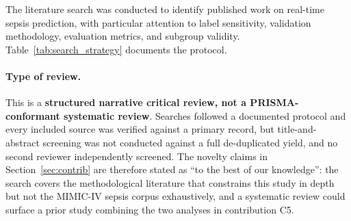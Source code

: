 The literature search was conducted to identify published work on real-time
sepsis prediction, with particular attention to label sensitivity, validation
methodology, evaluation metrics, and subgroup validity.
Table~\ref{tab:search_strategy} documents the protocol.

\paragraph{Type of review.} This is a \textbf{structured narrative critical
review, not a PRISMA-conformant systematic review}. Searches followed a
documented protocol and every included source was verified against a primary
record, but title-and-abstract screening was not conducted against a full
de-duplicated yield, and no second reviewer independently screened. The novelty
claims in Section~\ref{sec:contrib} are therefore stated as ``to the best of
our knowledge'': the search covers the methodological literature that
constrains this study in depth but not the MIMIC-IV sepsis corpus
exhaustively, and a systematic review could surface a prior study combining the
two analyses in contribution C5.

